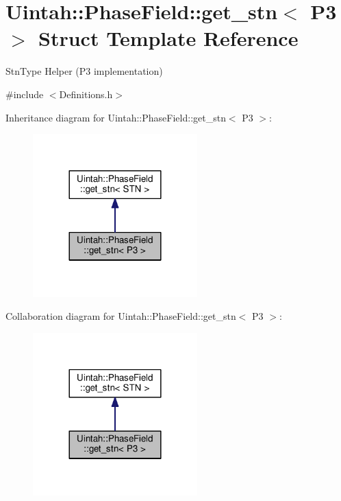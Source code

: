 \hypertarget{structUintah_1_1PhaseField_1_1get__stn_3_01P3_01_4}{}\section{Uintah\+:\+:Phase\+Field\+:\+:get\+\_\+stn$<$ P3 $>$ Struct Template Reference}
\label{structUintah_1_1PhaseField_1_1get__stn_3_01P3_01_4}


Stn\+Type Helper (P3 implementation)  




{\ttfamily \#include $<$Definitions.\+h$>$}



Inheritance diagram for Uintah\+:\+:Phase\+Field\+:\+:get\+\_\+stn$<$ P3 $>$\+:\nopagebreak
\begin{figure}[H]
\begin{center}
\leavevmode
\includegraphics[width=180pt]{structUintah_1_1PhaseField_1_1get__stn_3_01P3_01_4__inherit__graph}
\end{center}
\end{figure}


Collaboration diagram for Uintah\+:\+:Phase\+Field\+:\+:get\+\_\+stn$<$ P3 $>$\+:\nopagebreak
\begin{figure}[H]
\begin{center}
\leavevmode
\includegraphics[width=180pt]{structUintah_1_1PhaseField_1_1get__stn_3_01P3_01_4__coll__graph}
\end{center}
\end{figure}

